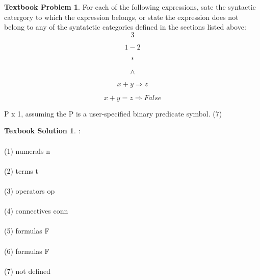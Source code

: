 \documentclass[10pt]{article}
\theoremstyle{definition}
\newtheorem{bp}{Textbook Problem}
\newtheorem{ts}{Texbook Solution}
\begin{document}
  
  \begin{bp}
  
	  For each of the following expressions, sate the syntactic catergory to which the expression belongs, or state the expression does not belong to any of the syntatctic categories defined in the sections listed above:
	  \begin{equation}
	  3
	  \end{equation}
	  
	  \begin{equation}
	  1 - 2
	  \end{equation}
	  
	  \begin{equation}
	  *
	  \end{equation}
	  
	  \begin{equation}
	  \wedge
	  \end{equation}
	  
	  \begin{equation}
	  x + y \Rightarrow z
	  \end{equation}
	  
	  \begin{equation}
	  x + y = z \Rightarrow False 
	  \end{equation}
	 
\indent \indent \indent \indent \indent \indent   P x 1, assuming the P is a user-specified binary predicate symbol.       \indent \indent \indent \indent \indent    (7)   
  		
  \end{bp}
  
  \begin{ts}:
  \\
  \\
  (1) numerals n
  \\
  \\
  (2) terms t
  \\
  \\
  (3) operators op
  \\
  \\
  (4) connectives conn
  \\
  \\
  (5) formulas F
  \\
  \\
  (6) formulas F
  \\
  \\
  (7) not defined
  \\
  \\
  \end{ts}
  
\end{document}
